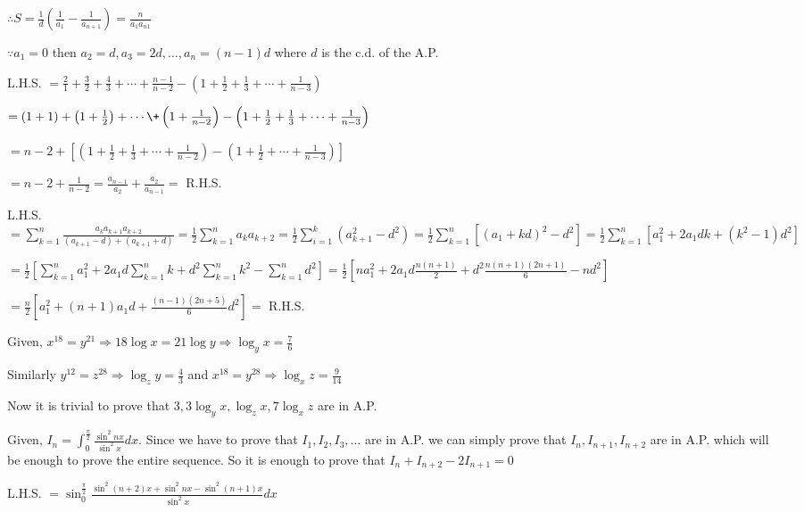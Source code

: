   $\therefore S = \frac{1}{d}\left(\frac{1}{a_1} - \frac{1}{a_{n + 1}}\right) = \frac{n}{a_1a_{n 1}}$
\item $\because a_1 = 0$ then $a_2 = d, a_3 = 2d, \ldots, a_n = (n - 1)d$ where $d$ is the c.d. of the A.P.

  L.H.S. $= \frac{2}{1} + \frac{3}{2} + \frac{4}{3} + \cdots + \frac{n - 1}{n - 2} - \left(1 + \frac{1}{2} +
  \frac{1}{3} + \cdots + \frac{1}{n - 3}\right)$

  $= (1 + 1) + \left(1 + \frac{1}{2}\right) + \cdots \+ \left(1 + \frac{1}{n - 2}\right) - \left(1 +
  \frac{1}{2} + \frac{1}{3} + \cdots + \frac{1}{n - 3}\right)$

  $= n - 2 + \left[\left(1 + \frac{1}{2} + \frac{1}{3} + \cdots + \frac{1}{n - 2}\right) - \left(1 +
    \frac{1}{2} + \cdots + \frac{1}{n - 3}\right)\right]$

  $= n - 2 + \frac{1}{n - 2} = \frac{a_{n - 1}}{a_2} + \frac{a_2}{a_{n - 1}} =$ R.H.S.
\item L.H.S. $= \displaystyle\sum_{k=1}^n\frac{a_ka_{k+1}a_{k+2}}{(a_{k + 1} - d) + (a_{k + 1} + d)} = \frac{1}{2}\sum_{k
  = 1}^na_ka_{k + 2} = \frac{1}{2}\sum_{i = 1}^k(a_{k + 1}^2 - d^2) = \frac{1}{2}\sum_{k = 1}^n[(a_1 + kd)^2 -
  d^2] = \frac{1}{2}\sum_{k = 1}^n[a_1^2 + 2a_1dk + (k^2 - 1)d^2]$

  $= \displaystyle\frac{1}{2}\left[\sum_{k = 1}^na_1^2 + 2a_1d\sum_{k = 1}^nk + d^2\sum_{k = 1}^nk^2 - \sum_{k = 1}^nd^2\right] =
  \frac{1}{2}\left[na_1^2 + 2a_1d\frac{n(n + 1)}{2} + d^2\frac{n(n + 1)(2n + 1)}{6} - nd^2\right]$

  $= \frac{n}{2}\left[a_1^2 + (n + 1)a_1d + \frac{(n - 1)(2n + 5)}{6}d^2\right] =$ R.H.S.
\item Given, $x^{18} = y^{21} \Rightarrow 18\log x = 21\log y \Rightarrow \log_yx = \frac{7}{6}$

  Similarly $y^{12} = z^{28} \Rightarrow \log_zy = \frac{4}{3}$ and $x^{18} = y^{28} \Rightarrow \log_xz =
  \frac{9}{14}$

  Now it is trivial to prove that $3, 3\log_yx, \log_zx, 7\log_xz$ are in A.P.
\item Given, $I_n = \displaystyle\int_0^{\tfrac{\pi}{2}}\frac{\sin^2nx}{\sin^2x}dx$. Since we have to prove
  that $I_1, I_2, I_3, \ldots$ are in A.P. we can simply prove that $I_n, I_{n + 1}, I_{n + 2}$ are in
  A.P. which will be enough to prove the entire sequence. So it is enough to prove that $I_n + I_{n + 2} -
  2I_{n + 1} = 0$

  L.H.S. $= \displaystyle\sin_0^{\tfrac{\pi}{2}}\frac{\sin^2(n + 2)x + \sin^2nx - \sin^2(n +
    1)x}{\sin^2x}dx$


